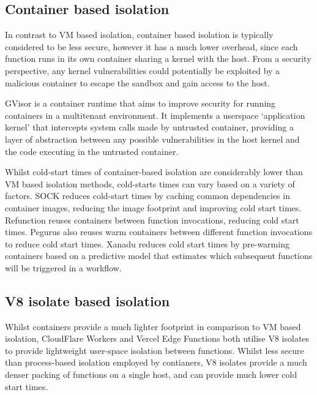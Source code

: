\subsection{Container based isolation}
In contrast to VM based isolation, container based isolation is typically considered to be less secure\cite{DemystifyingContainerVs}, however it has a much lower overhead, since each function runs in its own container sharing a kernel with the host\cite{WhatContainerDocker}. From a security perspective, any kernel vulnerabilities could potentially be exploited by a malicious container to escape the sandbox and gain access to the host\cite{linMeasurementStudyLinux2018}.

GVisor is a container runtime that aims to improve security for running containers in a multitenant environment\cite{GVisor}. It implements a userspace `application kernel' that intercepts system calls made by untrusted container, providing a layer of abstraction between any possible vulnerabilities in the host kernel and the code executing in the untrusted container.

Whilst cold-start times of container-based \faas{} isolation are considerably lower than VM based isolation methods, cold-starts times can vary based on a variety of factors. SOCK reduces cold-start times by caching common dependencies in container images, reducing the image footprint and improving cold start times\cite{oakesSOCKRapidTask2018}. Refunction reuses containers between function invocations, reducing cold start times\cite{oliverstenbomRefunctionEliminatingServerless2019}. Pegurus also reuses warm containers between different function invocations to reduce cold start times\cite{liPagurusEliminatingCold2021}. Xanadu reduces cold start times by pre-warming containers based on a predictive model that estimates which subsequent functions will be triggered in a \faas{} workflow\cite{dawXanaduMitigatingCascading2020}.

\subsection{V8 isolate based isolation}
Whilst containers provide a much lighter footprint in comparison to VM based isolation, CloudFlare Workers\cite{CloudComputingContainers2018} and Vercel Edge Functions\cite{EdgeRuntime} both utilise V8 isolates to provide lightweight user-space isolation between functions. Whilst less secure than process-based isolation employed by contianers, V8 isolates provide a much denser packing of functions on a single host, and can provide much lower cold start times.

